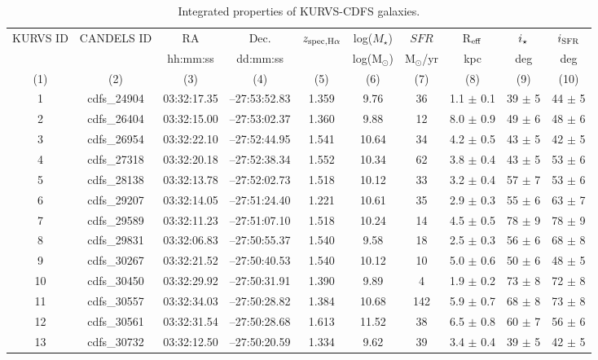 \begin{table}
\centering
\caption{Integrated properties of KURVS-CDFS galaxies.}
\label{tab1:KURVS_sample}
\begin{tabular}{cccccccccc} 
\hline
\hline
KURVS ID & CANDELS ID & RA & Dec. & $z_{\rm spec, H\alpha}$  &  log($M_{\star}$) & $SFR$ & R$_{\rm eff}$ & $i_{\rm \star}$ & $i_{\rm SFR}$ \\
 &  & hh:mm:ss & dd:mm:ss &  & log($\mathrm{M_{\odot}}$) & M$_{\odot}$/yr & kpc & deg & deg \\
(1) & (2) & (3) & (4) & (5) & (6) & (7) & (8) & (9) & (10) \\
\hline
1 & cdfs\_24904 & 03:32:17.35 & --27:53:52.83 & 1.359 & 9.76 & 36 & 1.1 $\pm$ 0.1 & 39 $\pm$ 5 & 44 $\pm$ 5 \\
2 & cdfs\_26404 & 03:32:15.00 & --27:53:02.37 & 1.360 & 9.88 & 12 & 8.0 $\pm$ 0.9 & 49 $\pm$ 6 & 48 $\pm$ 6 \\
3 & cdfs\_26954 & 03:32:22.10 & --27:52:44.95 & 1.541 & 10.64 & 34 & 4.2 $\pm$ 0.5 & 43 $\pm$ 5 & 42 $\pm$ 5 \\
4 & cdfs\_27318 & 03:32:20.18 & --27:52:38.34 & 1.552 & 10.34 & 62 & 3.8 $\pm$ 0.4 & 43 $\pm$ 5 & 53 $\pm$ 6 \\
5 & cdfs\_28138 & 03:32:13.78 & --27:52:02.73 & 1.518 & 10.12 & 33 & 3.2 $\pm$ 0.4 & 57 $\pm$ 7 & 53 $\pm$ 6 \\
6 & cdfs\_29207 & 03:32:14.05 & --27:51:24.40 & 1.221 & 10.61 & 35 & 2.9 $\pm$ 0.3 & 55 $\pm$ 6 & 63 $\pm$ 7 \\
7 & cdfs\_29589 & 03:32:11.23 & --27:51:07.10 & 1.518 & 10.24 & 14 & 4.5 $\pm$ 0.5 & 78 $\pm$ 9 & 78 $\pm$ 9 \\
8 & cdfs\_29831 & 03:32:06.83 & --27:50:55.37 & 1.540 & 9.58 & 18 & 2.5 $\pm$ 0.3 & 56 $\pm$ 6 & 68 $\pm$ 8 \\
9 & cdfs\_30267 & 03:32:21.52 & --27:50:40.53 & 1.540 & 10.12 & 10 & 5.0 $\pm$ 0.6 & 50 $\pm$ 6 & 48 $\pm$ 5 \\
10 & cdfs\_30450 & 03:32:29.92 & --27:50:31.91 & 1.390 & 9.89 & 4 & 1.9 $\pm$ 0.2 & 73 $\pm$ 8 & 72 $\pm$ 8 \\
11 & cdfs\_30557 & 03:32:34.03 & --27:50:28.82 & 1.384 & 10.68 & 142 & 5.9 $\pm$ 0.7 & 68 $\pm$ 8 & 73 $\pm$ 8 \\
12 & cdfs\_30561 & 03:32:31.54 & --27:50:28.68 & 1.613 & 11.52 & 38 & 6.5 $\pm$ 0.8 & 60 $\pm$ 7 & 56 $\pm$ 6 \\
13 & cdfs\_30732 & 03:32:12.50 & --27:50:20.59 & 1.334 & 9.62 & 39 & 3.4 $\pm$ 0.4 & 39 $\pm$ 5 & 42 $\pm$ 5 \\

\end{tabular}
\end{table}
